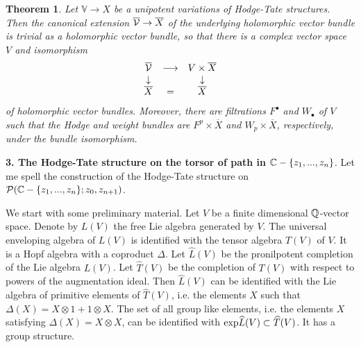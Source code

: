 \documentclass[10pt]{article}
\newtheorem{theorem}{Theorem}[section]
\begin{document}
\begin{theorem} Let ${\mathbb V} \to X$ be a unipotent variations of 
Hodge-Tate structures. 
Then the canonical extension ${\overline {\cal V}} \to \overline X$  
of the underlying holomorphic vector bundle is trivial as a holomorphic 
vector bundle, so that there is a complex vector space $V$ and isomorphism 
$$
\begin{array}{ccc}
\overline {\cal V}& \longrightarrow & V \times \overline X\\
\downarrow && \downarrow \\
\overline X &= & \overline X
\end{array}
$$
of holomorphic vector bundles. Moreover, there are filtrations $F^{\bullet}$ 
and $W_{\bullet}$ of $V$ such that the Hodge and weight bundles are 
$F^p \times \overline X$ and $W_p \times \overline X$, respectively, 
under the bundle isomorphism.
\end{theorem}


{\bf 3.  The Hodge-Tate structure on the torsor of path in ${\mathbb C} - \{z_1, ..., z_n\}$}.
Let me spell the construction of the Hodge-Tate structure on  
${\cal P}({\mathbb C} - \{z_1, ..., z_n\}; z_0, z_{n+1})$. 


We start with some preliminary material. Let $V$ be a finite dimensional 
${\mathbb Q}$-vector space. Denote by $L(V)$ the free Lie algebra generated by $V$. 
The universal enveloping algebra of $L(V)$ is identified with
 the tensor algebra $T(V)$ of $V$.
It is a Hopf algebra with a coproduct $\Delta$. 
Let $\widehat L(V)$ be the pronilpotent completion of the Lie algebra $L(V)$. 
Let $\widehat T(V)$ be the completion  of  
$T(V)$ with respect to powers of the augmentation ideal. Then $\widehat L(V)$ 
can be identified with the Lie algebra of primitive elements of $\widehat T(V)$, i.e. 
the elements $X$ such that $\Delta(X) = 
X \otimes 1 + 1 \otimes X$.  The set of all group like elements, i.e. the 
elements $X$ satisfying $\Delta(X) = X \otimes X$,  can be identified with 
${\rm exp} \widehat L(V) \subset \widehat T(V)$. It has a group structure. 
\end{document}
